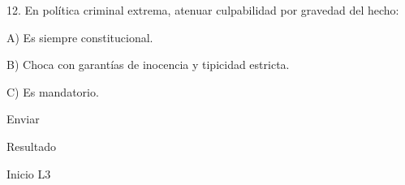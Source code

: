 \documentclass[11pt,a4paper]{article}
\begin{document}
      12. En política criminal extrema, atenuar culpabilidad por gravedad del hecho:\par

         A) Es siempre constitucional.\par
         B) Choca con garantías de inocencia y tipicidad estricta.\par
         C) Es mandatorio.\par


      Enviar\par


      Resultado\par









    Inicio L3\par
\end{document}
